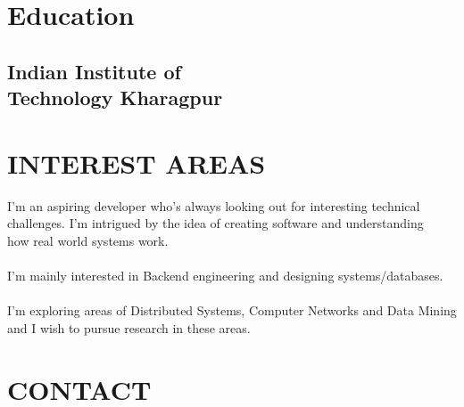 \documentclass[]{deedy-resume-openfont}
\begin{document}
%
%

%
%

\begin{minipage}[t]{0.33\textwidth} 


\section{Education} 

\subsection{Indian Institute of \\ Technology Kharagpur}
\sectionsep


\section{INTEREST AREAS}
I'm an aspiring developer who's always looking out for interesting technical challenges. I'm intrigued by the idea of creating software and understanding \\ how real world systems work. \\~\\
I'm mainly interested in Backend engineering and designing systems/databases. \\~\\
I'm exploring areas of Distributed Systems, Computer Networks and Data Mining and I wish to pursue research in these areas. 
\sectionsep


\section{CONTACT} 
\sectionsep


\end{minipage}
\end{document}
